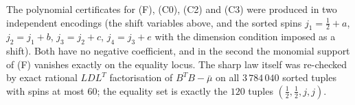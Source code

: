 The polynomial certificates for (F), (C0), (C2) and (C3) were produced in two independent
encodings (the shift variables above, and the sorted spins $j_1=\frac12+a$, $j_2=j_1+b$,
$j_3=j_2+c$, $j_4=j_3+e$ with the dimension condition imposed as a shift). Both have no
negative coefficient, and in the second the monomial support of (F) vanishes exactly on the
equality locus. The sharp law itself was re-checked by exact rational $LDL^T$ factorisation of
$B^TB-\bar\mu$ on all $3\,784\,040$ sorted tuples with spins at most $60$; the equality set is
exactly the $120$ tuples $(\frac12,\frac12,j,j)$.
